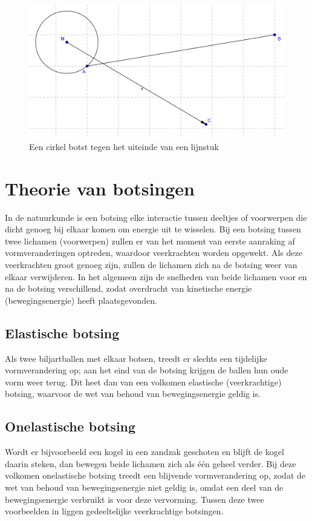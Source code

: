 \documentclass[12pt,a4paper]{article}
\begin{document}
	\begin{figure}[h]
		\centerline{\includegraphics[width=\textwidth]{Plaatjes/Bal-Lijnstuk-Uiteinde.png}}
		\caption{Een cirkel botst tegen het uiteinde van een lijnstuk}
		\label{botsing-lijnstuk-uiteinden}
	\end{figure}
	
	\newpage

	\section{Theorie van botsingen}
	In de natuurkunde is een botsing elke interactie tussen deeltjes of voorwerpen die dicht genoeg bij elkaar komen om energie uit te wisselen. Bij een botsing tussen twee lichamen (voorwerpen) zullen er van het moment van eerste aanraking af vormveranderingen optreden, waardoor veerkrachten worden opgewekt. Als deze veerkrachten groot genoeg zijn, zullen de lichamen zich na de botsing weer van elkaar verwijderen. In het algemeen zijn de snelheden van beide lichamen voor en na de botsing verschillend, zodat overdracht van kinetische energie (bewegingsenergie) heeft plaatsgevonden.

	\subsection{Elastische botsing}
	Als twee biljartballen met elkaar botsen, treedt er slechts een tijdelijke vormverandering op; aan het eind van de botsing krijgen de ballen hun oude vorm weer terug. Dit heet dan van een volkomen elastische (veerkrachtige) botsing, waarvoor de wet van behoud van bewegingsenergie geldig is.

	\subsection{Onelastische botsing}
	Wordt er bijvoorbeeld een kogel in een zandzak geschoten en blijft de kogel daarin steken, dan bewegen beide lichamen zich als \'{e}\'{e}n geheel verder. Bij deze volkomen onelastische botsing treedt een blijvende vormverandering op, zodat de wet van behoud van bewegingsenergie niet geldig is, omdat een deel van de bewegingsenergie verbruikt is voor deze vervorming.
	Tussen deze twee voorbeelden in liggen gedeeltelijke veerkrachtige botsingen.
\end{document}
